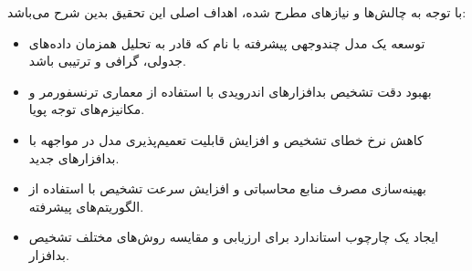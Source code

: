 با توجه به چالش‌ها و نیازهای مطرح شده، اهداف اصلی این تحقیق بدین شرح می‌باشد:
\begin{itemize}
    \renewcommand{\labelitemi}{\lr{$\bullet$}}
    \item توسعه یک مدل چندوجهی پیشرفته با نام  که قادر به تحلیل همزمان داده‌های جدولی، گرافی و ترتیبی باشد.
    \item بهبود دقت تشخیص بدافزارهای اندرویدی با استفاده از معماری ترنسفورمر و مکانیزم‌های توجه پویا.
    \item کاهش نرخ خطای تشخیص و افزایش قابلیت تعمیم‌پذیری مدل در مواجهه با بدافزارهای جدید.
    \item بهینه‌سازی مصرف منابع محاسباتی و افزایش سرعت تشخیص با استفاده از الگوریتم‌های پیشرفته.
    \item ایجاد یک چارچوب استاندارد برای ارزیابی و مقایسه روش‌های مختلف تشخیص بدافزار.
\end{itemize}

